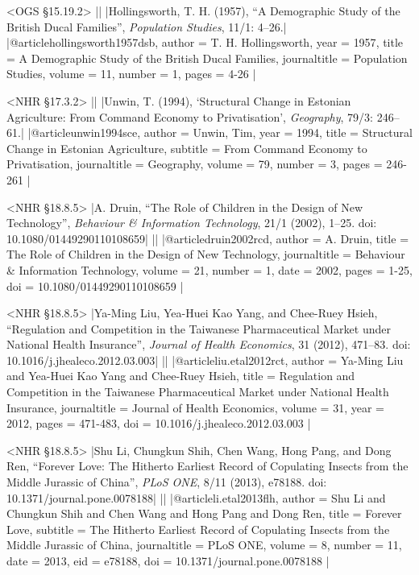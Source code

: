 \documentclass[extrafontsizes,11pt,a4paper,oneside]{memoir}
\begin{document}
\bibexample<OGS \S15.19.2>
||%
|Hollingsworth, T. H. (1957), \enquote{A Demographic Study of the British Ducal Families}, \emph{Population Studies}, 11/1: 4–26.|%
|@article{hollingsworth1957dsb,
  author = {T. H. Hollingsworth},
  year = {1957},
  title = {A Demographic Study of the British Ducal Families},
  journaltitle = {Population Studies},
  volume = {11},
  number = {1},
  pages = {4-26}
}|

\bibexample<NHR \S17.3.2>
||%
|Unwin, T. (1994), ‘Structural Change in Estonian Agriculture: From Command Economy to Privatisation’, \emph{Geography}, 79/3: 246–61.|%
|@article{unwin1994sce,
  author = {Unwin, Tim},
  year = {1994},
  title = {Structural Change in Estonian Agriculture},
  subtitle = {From Command Economy to Privatisation},
  journaltitle = {Geography},
  volume = {79},
  number = {3},
  pages = {246-261}
}|

\bibexample<NHR \S18.8.5>
|A. Druin, \enquote{The Role of Children in the Design of New Technology}, \emph{Behaviour \& Information Technology}, 21/1 (2002), 1–25. doi: 10.1080/01449290110108659|%
||%
|@article{druin2002rcd,
  author = {A. Druin},
  title = {The Role of Children in the Design of New Technology},
  journaltitle = {Behaviour \& Information Technology},
  volume = {21},
  number = {1},
  date = {2002},
  pages = {1-25},
  doi = {10.1080/01449290110108659}
}|

\bibexample<NHR \S18.8.5>
|Ya-Ming Liu, Yea-Huei Kao Yang, and Chee-Ruey Hsieh, \enquote{Regulation and Competition in the Taiwanese Pharmaceutical Market under National Health Insurance}, \emph{Journal of Health Economics}, 31 (2012), 471–83. doi: 10.1016/j.jhealeco.2012.03.003|%
||%
|@article{liu.etal2012rct,
  author = {Ya-Ming Liu and Yea-Huei Kao Yang and Chee-Ruey Hsieh},
  title = {Regulation and Competition in the Taiwanese Pharmaceutical Market under National Health Insurance},
  journaltitle = {Journal of Health Economics},
  volume = {31},
  year = {2012},
  pages = {471-483},
  doi = {10.1016/j.jhealeco.2012.03.003}
}|

\bibexample<NHR \S18.8.5>
|Shu Li, Chungkun Shih, Chen Wang, Hong Pang, and Dong Ren, \enquote{Forever Love: The Hitherto Earliest Record of Copulating Insects from the Middle Jurassic of China}, \emph{PLoS ONE}, 8/11 (2013), e78188. doi: 10.1371/journal.pone.0078188|%
||%
|@article{li.etal2013flh,
  author = {Shu Li and Chungkun Shih and Chen Wang and Hong Pang and Dong Ren},
  title = {Forever Love},
  subtitle = {The Hitherto Earliest Record of Copulating Insects from the Middle Jurassic of China},
  journaltitle = {PLoS ONE},
  volume = {8},
  number = {11},
  date = {2013},
  eid = {e78188},
  doi = {10.1371/journal.pone.0078188}
}|
\end{document}
